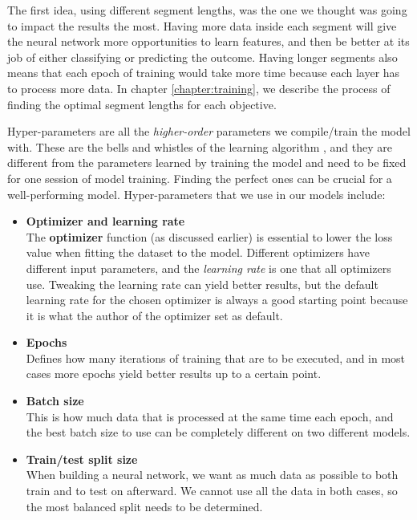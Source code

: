 \noindent The first idea, using different segment lengths, was the one we thought was going to impact the results the most. Having more data inside each segment will give the neural network more opportunities to learn features, and then be better at its job of either classifying or predicting the outcome. Having longer segments also means that each epoch of training would take more time because each layer has to process more data. In chapter \ref{chapter:training}, we describe the process of finding the optimal segment lengths for each objective.

Hyper-parameters are all the \textit{higher-order} parameters we compile/train the model with. These are the bells and whistles of the learning algorithm \cite{hyperparameters}, and they are different from the parameters learned by training the model and need to be fixed for one session of model training. Finding the perfect ones can be crucial for a well-performing model. Hyper-parameters that we use in our models include:

\begin{itemize}
      \item \textbf{Optimizer and learning rate}\\
          The \textbf{optimizer} function (as discussed earlier) is essential to lower the loss value when fitting the dataset to the model. 
          Different optimizers have different input parameters, and the \textit{learning rate} is one that all optimizers use. 
          Tweaking the learning rate can yield better results, but the default learning rate for the chosen optimizer is always a good starting point because it is what the author of the optimizer set as default.
      \item \textbf{Epochs}\\
          Defines how many iterations of training that are to be executed, and in most cases more epochs yield better results up to a certain point.
      \item \textbf{Batch size}\\
          This is how much data that is processed at the same time each epoch, and the best batch size to use can be completely different on two different models. 
      \item \textbf{Train/test split size}\\
          When building a neural network, we want as much data as possible to both train and to test on afterward. We cannot use all the data in both cases, so the most balanced split needs to be determined.
\end{itemize}